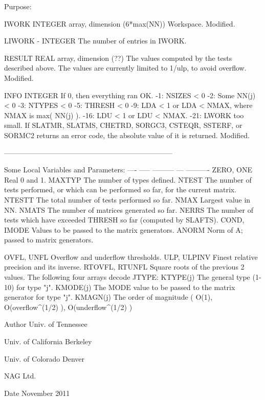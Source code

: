 \begin{DoxyParagraph}{Purpose\+: }
\begin{DoxyVerb}
  IWORK   INTEGER array, dimension (6*max(NN))
          Workspace.
          Modified.

  LIWORK - INTEGER
           The number of entries in IWORK.

  RESULT  REAL array, dimension (??)
          The values computed by the tests described above.
          The values are currently limited to 1/ulp, to avoid
          overflow.
          Modified.

  INFO    INTEGER
          If 0, then everything ran OK.
           -1: NSIZES < 0
           -2: Some NN(j) < 0
           -3: NTYPES < 0
           -5: THRESH < 0
           -9: LDA < 1 or LDA < NMAX, where NMAX is max( NN(j) ).
          -16: LDU < 1 or LDU < NMAX.
          -21: LWORK too small.
          If  SLATMR, SLATMS, CHETRD, SORGC3, CSTEQR, SSTERF,
              or SORMC2 returns an error code, the
              absolute value of it is returned.
          Modified.

-----------------------------------------------------------------------

       Some Local Variables and Parameters:
       ---- ----- --------- --- ----------
       ZERO, ONE       Real 0 and 1.
       MAXTYP          The number of types defined.
       NTEST           The number of tests performed, or which can
                       be performed so far, for the current matrix.
       NTESTT          The total number of tests performed so far.
       NMAX            Largest value in NN.
       NMATS           The number of matrices generated so far.
       NERRS           The number of tests which have exceeded THRESH
                       so far (computed by SLAFTS).
       COND, IMODE     Values to be passed to the matrix generators.
       ANORM           Norm of A; passed to matrix generators.

       OVFL, UNFL      Overflow and underflow thresholds.
       ULP, ULPINV     Finest relative precision and its inverse.
       RTOVFL, RTUNFL  Square roots of the previous 2 values.
               The following four arrays decode JTYPE:
       KTYPE(j)        The general type (1-10) for type "j".
       KMODE(j)        The MODE value to be passed to the matrix
                       generator for type "j".
       KMAGN(j)        The order of magnitude ( O(1),
                       O(overflow^(1/2) ), O(underflow^(1/2) )\end{DoxyVerb}
 
\end{DoxyParagraph}
\begin{DoxyAuthor}{Author}
Univ. of Tennessee 

Univ. of California Berkeley 

Univ. of Colorado Denver 

N\+A\+G Ltd. 
\end{DoxyAuthor}
\begin{DoxyDate}{Date}
November 2011 
\end{DoxyDate}
\hypertarget{group__complex__eig_ga730ba08b058674ceabf267420c5c4d01}{}
